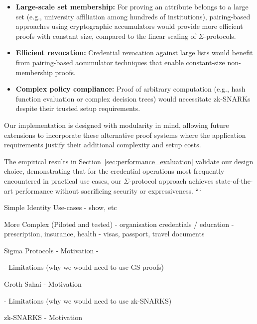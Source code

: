 \begin{itemize}
    \item \textbf{Large-scale set membership:} For proving an attribute belongs to a large set (e.g., university affiliation among hundreds of institutions), pairing-based approaches using cryptographic accumulators would provide more efficient proofs with constant size, compared to the linear scaling of $\Sigma$-protocols.
    
    \item \textbf{Efficient revocation:} Credential revocation against large lists would benefit from pairing-based accumulator techniques that enable constant-size non-membership proofs.
    
    \item \textbf{Complex policy compliance:} Proof of arbitrary computation (e.g., hash function evaluation or complex decision trees) would necessitate zk-SNARKs despite their trusted setup requirements.
\end{itemize}

Our implementation is designed with modularity in mind, allowing future extensions to incorporate these alternative proof systems where the application requirements justify their additional complexity and setup costs.

The empirical results in Section~\ref{sec:performance_evaluation} validate our design choice, demonstrating that for the credential operations most frequently encountered in practical use cases, our $\Sigma$-protocol approach achieves state-of-the-art performance without sacrificing security or expressiveness.
```



Simple Identity Use-cases
- show, etc


More Complex (Piloted and tested)
- organisation credentials / education
- prescription, insurance, health
- visas, passport, travel documents





Sigma Protocols
- Motivation
- 


- Limitations (why we would need to use GS proofs)

Groth Sahai
- Motivation



- Limitations (why we would need to use zk-SNARKS)

zk-SNARKS
- Motivation





